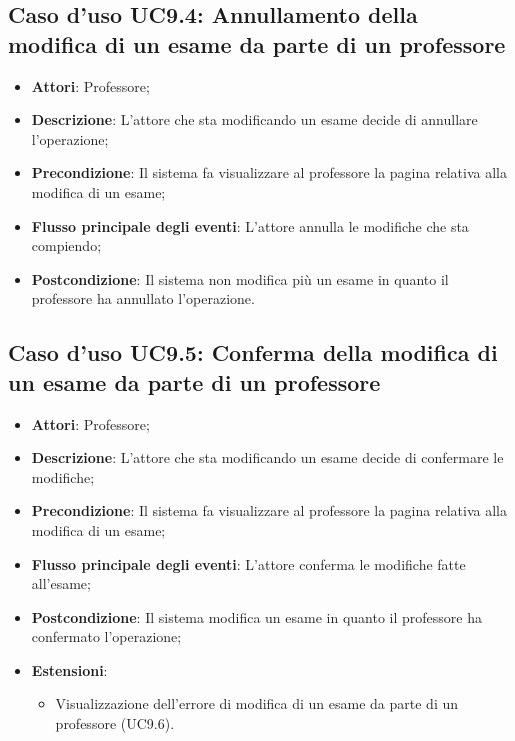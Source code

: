 \subsection{Caso d'uso \texorpdfstring{UC9.4}{UC9.4}: Annullamento della modifica di un esame da parte di un professore}
\begin{itemize}
	\item \textbf{Attori}: Professore;
	\item \textbf{Descrizione}: L'attore che sta modificando un esame decide di annullare l'operazione;
	\item \textbf{Precondizione}: Il sistema fa visualizzare al professore la pagina relativa alla modifica di un esame;
	
	\item \textbf{Flusso principale degli eventi}: L'attore annulla le modifiche che sta compiendo;
	\item \textbf{Postcondizione}: Il sistema non modifica più un esame in quanto il professore ha annullato l'operazione.
	
\end{itemize}
\subsection{Caso d'uso \texorpdfstring{UC9.5}{UC9.5}: Conferma della modifica di un esame da parte di un professore}
\begin{itemize}
	\item \textbf{Attori}: Professore;
	\item \textbf{Descrizione}: L'attore che sta modificando un esame decide di confermare le modifiche;
	\item \textbf{Precondizione}: Il sistema fa visualizzare al professore la pagina relativa alla modifica di un esame;
	
	\item \textbf{Flusso principale degli eventi}: L'attore conferma le modifiche fatte all'esame;
	\item \textbf{Postcondizione}: Il sistema modifica un esame in quanto il professore ha confermato l'operazione;
	
	\item \textbf{Estensioni}:
	\begin{itemize}
		\item Visualizzazione dell'errore di modifica di un esame da parte di un professore (UC9.6).
	\end{itemize}
\end{itemize}
